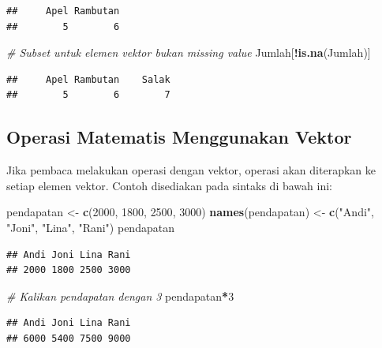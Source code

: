 \documentclass[
]{book}
\newenvironment{Shaded}{\begin{snugshade}}{\end{snugshade}}
\newcommand{\CommentTok}[1]{\textcolor[rgb]{0.56,0.35,0.01}{\textit{#1}}}
\newcommand{\DecValTok}[1]{\textcolor[rgb]{0.00,0.00,0.81}{#1}}
\newcommand{\FunctionTok}[1]{\textcolor[rgb]{0.13,0.29,0.53}{\textbf{#1}}}
\newcommand{\NormalTok}[1]{#1}
\newcommand{\OtherTok}[1]{\textcolor[rgb]{0.56,0.35,0.01}{#1}}
\newcommand{\SpecialCharTok}[1]{\textcolor[rgb]{0.81,0.36,0.00}{\textbf{#1}}}
\newcommand{\StringTok}[1]{\textcolor[rgb]{0.31,0.60,0.02}{#1}}
\theoremstyle{definition}
\theoremstyle{definition}
\theoremstyle{definition}
\theoremstyle{definition}
\theoremstyle{remark}
\begin{document}
\begin{verbatim}
##     Apel Rambutan 
##        5        6
\end{verbatim}

\begin{Shaded}
\begin{Highlighting}[]
\CommentTok{\# Subset untuk elemen vektor bukan missing value}
\NormalTok{Jumlah[}\SpecialCharTok{!}\FunctionTok{is.na}\NormalTok{(Jumlah)]}
\end{Highlighting}
\end{Shaded}

\begin{verbatim}
##     Apel Rambutan    Salak 
##        5        6        7
\end{verbatim}

\hypertarget{vectorops}{%
\subsection{Operasi Matematis Menggunakan Vektor}\label{vectorops}}

Jika pembaca melakukan operasi dengan vektor, operasi akan diterapkan ke setiap elemen vektor. Contoh disediakan pada sintaks di bawah ini:

\begin{Shaded}
\begin{Highlighting}[]
\NormalTok{pendapatan }\OtherTok{\textless{}{-}} \FunctionTok{c}\NormalTok{(}\DecValTok{2000}\NormalTok{, }\DecValTok{1800}\NormalTok{, }\DecValTok{2500}\NormalTok{, }\DecValTok{3000}\NormalTok{)}
\FunctionTok{names}\NormalTok{(pendapatan) }\OtherTok{\textless{}{-}} \FunctionTok{c}\NormalTok{(}\StringTok{"Andi"}\NormalTok{, }\StringTok{"Joni"}\NormalTok{, }\StringTok{"Lina"}\NormalTok{, }\StringTok{"Rani"}\NormalTok{)}
\NormalTok{pendapatan}
\end{Highlighting}
\end{Shaded}

\begin{verbatim}
## Andi Joni Lina Rani 
## 2000 1800 2500 3000
\end{verbatim}

\begin{Shaded}
\begin{Highlighting}[]
\CommentTok{\# Kalikan pendapatan dengan 3}
\NormalTok{pendapatan}\SpecialCharTok{*}\DecValTok{3}
\end{Highlighting}
\end{Shaded}

\begin{verbatim}
## Andi Joni Lina Rani 
## 6000 5400 7500 9000
\end{verbatim}
\end{document}

